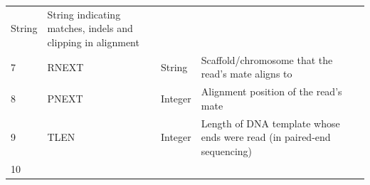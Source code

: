 \documentclass[]{krantz}
\begin{document}
\begin{longtable}[]{@{}llll@{}}
\begin{minipage}[t]{0.15\columnwidth}
String\strut
\end{minipage} & \begin{minipage}[t]{0.41\columnwidth}\raggedright
String indicating matches,
indels and clipping in
alignment\strut
\end{minipage}\tabularnewline
\begin{minipage}[t]{0.11\columnwidth}\raggedright
7\strut
\end{minipage} & \begin{minipage}[t]{0.10\columnwidth}\raggedright
RNEXT\strut
\end{minipage} & \begin{minipage}[t]{0.15\columnwidth}\raggedright
String\strut
\end{minipage} & \begin{minipage}[t]{0.41\columnwidth}\raggedright
Scaffold/chromosome that the
read's mate aligns to\strut
\end{minipage}\tabularnewline
\begin{minipage}[t]{0.11\columnwidth}\raggedright
8\strut
\end{minipage} & \begin{minipage}[t]{0.10\columnwidth}\raggedright
PNEXT\strut
\end{minipage} & \begin{minipage}[t]{0.15\columnwidth}\raggedright
Integer\strut
\end{minipage} & \begin{minipage}[t]{0.41\columnwidth}\raggedright
Alignment position of the
read's mate\strut
\end{minipage}\tabularnewline
\begin{minipage}[t]{0.11\columnwidth}\raggedright
9\strut
\end{minipage} & \begin{minipage}[t]{0.10\columnwidth}\raggedright
TLEN\strut
\end{minipage} & \begin{minipage}[t]{0.15\columnwidth}\raggedright
Integer\strut
\end{minipage} & \begin{minipage}[t]{0.41\columnwidth}\raggedright
Length of DNA template whose
ends were read (in paired-end
sequencing)\strut
\end{minipage}\tabularnewline
\begin{minipage}[t]{0.11\columnwidth}\raggedright
10\strut
\end{minipage} & \begin{minipage}[t]{0.10\columnwidth}\raggedright

\end{minipage}
\end{longtable}
\end{document}
